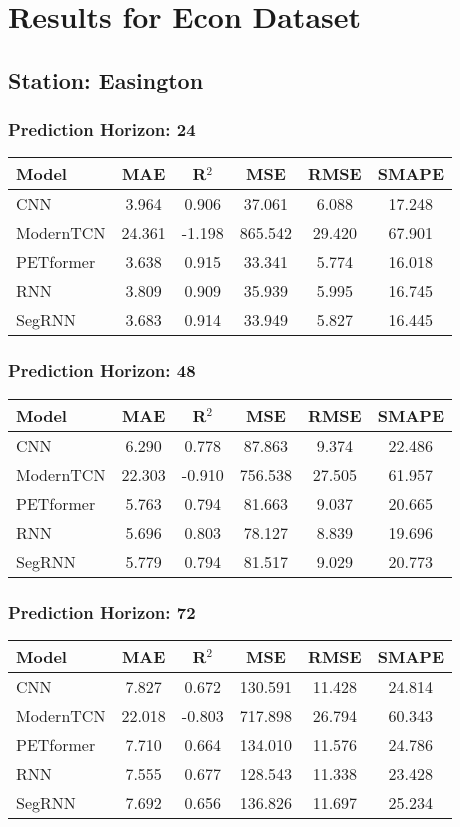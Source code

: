\section*{Results for Econ Dataset}
\subsection*{Station: Easington}
\subsubsection*{Prediction Horizon: 24}
\begin{tabular}{lccccc}
\toprule
Model & MAE & R$^2$ & MSE & RMSE & SMAPE \\
\midrule
CNN & 3.964 & 0.906 & 37.061 & 6.088 & 17.248 \\
ModernTCN & 24.361 & -1.198 & 865.542 & 29.420 & 67.901 \\
PETformer & 3.638 & 0.915 & 33.341 & 5.774 & 16.018 \\
RNN & 3.809 & 0.909 & 35.939 & 5.995 & 16.745 \\
SegRNN & 3.683 & 0.914 & 33.949 & 5.827 & 16.445 \\
\bottomrule
\end{tabular}
\vspace{0.5cm}
\subsubsection*{Prediction Horizon: 48}
\begin{tabular}{lccccc}
\toprule
Model & MAE & R$^2$ & MSE & RMSE & SMAPE \\
\midrule
CNN & 6.290 & 0.778 & 87.863 & 9.374 & 22.486 \\
ModernTCN & 22.303 & -0.910 & 756.538 & 27.505 & 61.957 \\
PETformer & 5.763 & 0.794 & 81.663 & 9.037 & 20.665 \\
RNN & 5.696 & 0.803 & 78.127 & 8.839 & 19.696 \\
SegRNN & 5.779 & 0.794 & 81.517 & 9.029 & 20.773 \\
\bottomrule
\end{tabular}
\vspace{0.5cm}
\subsubsection*{Prediction Horizon: 72}
\begin{tabular}{lccccc}
\toprule
Model & MAE & R$^2$ & MSE & RMSE & SMAPE \\
\midrule
CNN & 7.827 & 0.672 & 130.591 & 11.428 & 24.814 \\
ModernTCN & 22.018 & -0.803 & 717.898 & 26.794 & 60.343 \\
PETformer & 7.710 & 0.664 & 134.010 & 11.576 & 24.786 \\
RNN & 7.555 & 0.677 & 128.543 & 11.338 & 23.428 \\
SegRNN & 7.692 & 0.656 & 136.826 & 11.697 & 25.234 \\
\bottomrule
\end{tabular}
\vspace{0.5cm}
